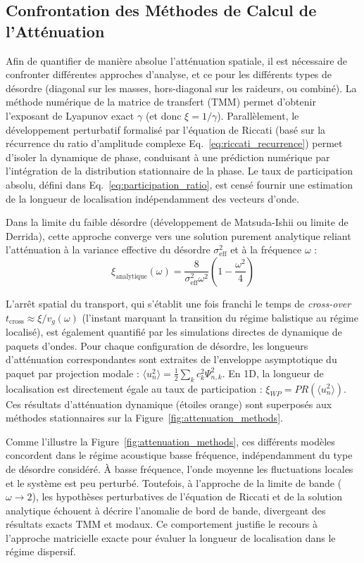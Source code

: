 \subsection{Confrontation des Méthodes de Calcul de l'Atténuation}
Afin de quantifier de manière absolue l'atténuation spatiale, il est nécessaire de confronter différentes approches d'analyse, et ce pour les différents types de désordre (diagonal sur les masses, hors-diagonal sur les raideurs, ou combiné). La méthode numérique de la matrice de transfert (TMM) permet d'obtenir l'exposant de Lyapunov exact $\gamma$ (et donc $\xi=1/\gamma$). Parallèlement, le développement perturbatif formalisé par l'équation de Riccati (basé sur la récurrence du ratio d'amplitude complexe Eq.~\eqref{eq:riccati_recurrence}) permet d'isoler la dynamique de phase, conduisant à une prédiction numérique par l'intégration de la distribution stationnaire de la phase. Le taux de participation absolu, défini dans Eq.~\eqref{eq:participation_ratio}, est censé fournir une estimation de la longueur de localisation indépendamment des vecteurs d'onde.~\cite{bell1970atomic,bell1972dynamics}

Dans la limite du faible désordre (développement de Matsuda-Ishii ou limite de Derrida), cette approche converge vers une solution purement analytique reliant l'atténuation à la variance effective du désordre $\sigma_{\text{eff}}^2$ et à la fréquence $\omega$ :
\begin{equation}
    \xi_{\text{analytique}}(\omega) = \frac{8}{\sigma_{\text{eff}}^2 \omega^2} \left( 1 - \frac{\omega^2}{4} \right)
    \label{eq:matsuda_ishii_localization}
\end{equation}

L'arrêt spatial du transport, qui s'établit une fois franchi le temps de \textit{cross-over} $t_{\text{cross}} \approx \xi / v_g(\omega)$ (l'instant marquant la transition du régime balistique au régime localisé), est également quantifié par les simulations directes de dynamique de paquets d'ondes. Pour chaque configuration de désordre, les longueurs d'atténuation correspondantes sont extraites de l'enveloppe asymptotique du paquet par projection modale : $\langle u_n^2 \rangle = \frac{1}{2} \sum_k c_k^2 \Psi_{n,k}^2$. En 1D, la longueur de localisation est directement égale au taux de participation : $\xi_{WP} = PR(\langle u_n^2 \rangle)$. Ces résultats d'atténuation dynamique (étoiles orange) sont superposés aux méthodes stationnaires sur la Figure~\ref{fig:attenuation_methods}.

Comme l'illustre la Figure~\ref{fig:attenuation_methods}, ces différents modèles concordent dans le régime acoustique basse fréquence, indépendamment du type de désordre considéré. À basse fréquence, l'onde moyenne les fluctuations locales et le système est peu perturbé. Toutefois, à l'approche de la limite de bande ($\omega \to 2$), les hypothèses perturbatives de l'équation de Riccati et de la solution analytique échouent à décrire l'anomalie de bord de bande, divergeant des résultats exacts TMM et modaux. Ce comportement justifie le recours à l'approche matricielle exacte pour évaluer la longueur de localisation dans le régime dispersif.

